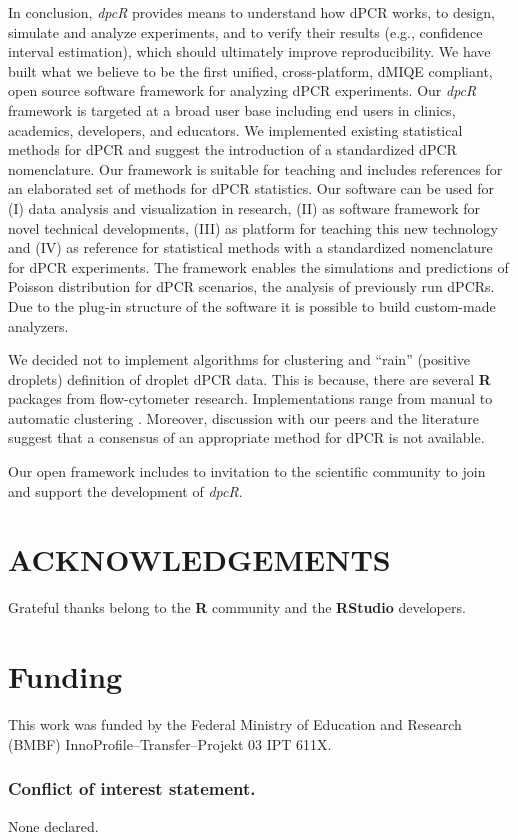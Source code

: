 \documentclass[a4,center,fleqn]{NAR}
\begin{document}
In conclusion, \textit{dpcR} provides means to understand how dPCR works, 
to design, simulate and analyze experiments, and to verify their results (e.g., 
confidence interval estimation), which should ultimately improve 
reproducibility. We have built what we believe to be the first unified, 
cross-platform, dMIQE compliant, open source software framework for 
analyzing dPCR experiments. Our \textit{dpcR} framework is 
targeted at a broad user base including end users in clinics, academics, 
developers, and educators. We implemented existing statistical methods for dPCR 
and suggest the introduction of a standardized dPCR nomenclature. Our 
framework is suitable for teaching and includes references for an elaborated 
set of methods for dPCR statistics. Our software can be used for (I) data 
analysis and visualization in research, (II) as software framework for novel 
technical developments, (III) as platform for teaching this new technology and 
(IV) as reference for statistical methods with a standardized nomenclature for 
dPCR experiments. The framework enables the simulations and predictions of Poisson 
distribution for dPCR scenarios, the analysis of previously run dPCRs. Due to 
the plug-in structure of the software it is possible to build custom-made 
analyzers.

We decided not to implement algorithms for clustering and ``rain'' (positive 
droplets) definition of droplet dPCR data. This is because, there are several 
\textbf{R} packages from flow-cytometer research. Implementations range from 
manual to automatic clustering \cite{le_meur_computational_2013, Malek15022015, 
trypsteen_ddpcrquant_2015}. Moreover, discussion with our peers and the 
literature suggest that a consensus of an appropriate method for dPCR is not 
available.

Our open framework includes to invitation to the scientific community to join and 
support the development of \textit{dpcR}.


\section{ACKNOWLEDGEMENTS}

Grateful thanks belong to the \textbf{R} community and the \textbf{RStudio} developers.

\section{Funding}
This work was funded by the Federal Ministry of Education and Research (BMBF) InnoProfile--Transfer--Projekt 03 IPT 611X.
 
\subsubsection{Conflict of interest statement.} None declared.



\end{document}
